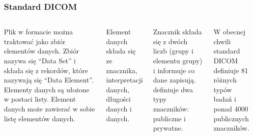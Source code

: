 \documentclass[aspectratio=169]{beamer}
\begin{document}
\begin{frame}[t]
    \frametitle{Standard DICOM}
    \begin{columns}[T]
        \scriptsize
        Plik w formacie \DICOM można traktować jako zbiór elementów danych.
        Zbiór nazywa się \enquote{Data Set} i składa się z rekordów, które nazywają się \enquote{Data Element}.
        Elementy danych są ułożone w postaci listy.
        Element danych może zawierać w sobie listę elementów danych.

        \vspace{1em}
        Element danych składa się ze znacznika, interpretacji danych, długości danych i danych.

        \vspace{1em}
        Znacznik składa się z dwóch liczb (grupy i elementu grupy) i informuje co dane zapisują.
        \DICOM definiuje dwa typy znaczników: publiczne i prywatne.

        \vspace{1em}
        W obecnej chwili standard DICOM definiuje 81 różnych typów badań i ponad 4000 publicznych znaczników.


\end{columns}
\end{frame}
\end{document}
